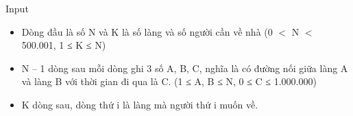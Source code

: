 Input
\begin{itemize}
	\item     Dòng đầu là số N và K là số làng và số người cần về nhà (0 $<$ N $<$ 500.001, 1 ≤ K ≤ N)   
	\item     N – 1 dòng sau mỗi dòng ghi 3 số A, B, C, nghĩa là có đường nối giữa làng A và làng B với thời gian đi qua là C. (1 ≤ A, B ≤ N, 0 ≤ C ≤ 1.000.000)   
	\item     K dòng sau, dòng thứ i là làng mà người thứ i muốn về.   
\end{itemize}